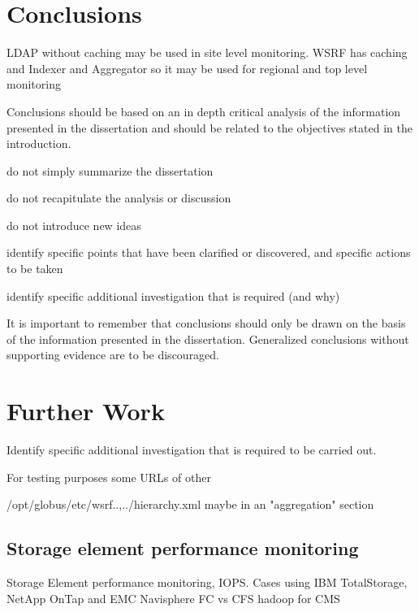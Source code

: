 \section{Conclusions}

LDAP without caching may be used in site level monitoring.
WSRF has caching and Indexer and Aggregator so it may be used for regional and top level monitoring


Conclusions should be based on an in depth critical analysis of the information presented in the dissertation and should be related to the objectives stated in the introduction.

do not simply summarize the dissertation

do not recapitulate the analysis or discussion

do not introduce new ideas

identify specific points that have been clarified or discovered, and specific actions to be taken

identify specific additional investigation that is required (and why)

It is important to remember that conclusions should only be drawn on the basis of the information presented in the dissertation. Generalized conclusions without supporting evidence are to be
discouraged.

\section{Further Work}
Identify specific additional investigation that is required to be carried out.

For testing purposes some URLs of other 

/opt/globus/etc/wsrf..,../hierarchy.xml maybe in an "aggregation" section

\subsection{Storage element performance monitoring}
Storage Element performance monitoring, IOPS. Cases using IBM TotalStorage, NetApp OnTap and EMC Navisphere
FC vs CFS \cite{brzezniak2008analysis}
hadoop for CMS \cite{hadoop}

